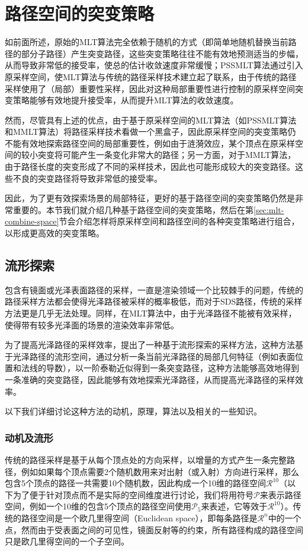 \section{路径空间的突变策略}\label{sec:pt-manifold}
如前面所述，原始的MLT算法完全依赖于随机的方式（即简单地随机替换当前路径的部分子路径）产生突变路径，这些突变策略往往不能有效地预测适当的步幅，从而导致非常低的接受率，使总的估计收敛速度非常缓慢；PSSMLT算法通过引入原采样空间，使MLT算法与传统的路径采样技术建立起了联系，由于传统的路径采样使用了（局部）重要性采样，因此对这种局部重要性进行控制的原采样空间突变策略能够有效地提升接受率，从而提升MLT算法的收敛速度。

然而，尽管具有上述的优点，由于基于原采样空间的MLT算法（如PSSMLT算法和MMLT算法）将路径采样技术看做一个黑盒子，因此原采样空间的突变策略仍不能有效地探索路径空间的局部重要性，例如由于涟漪效应，某个顶点在原采样空间的较小突变将可能产生一条变化非常大的路径；另一方面，对于MMLT算法，由于路径长度的突变形成了不同的采样技术，因此也可能形成较大的突变路径。这些不良的突变路径将导致非常低的接受率。

因此，为了更有效探索场景的局部特征，更好的基于路径空间的突变策略仍然是非常重要的。本节我们就介绍几种基于路径空间的突变策略，然后在第\ref{sec:mlt-combine-space}节会介绍怎样将原采样空间和路径空间的各种突变策略进行组合，以形成更高效的突变策略。




\subsection{流形探索}\label{sec:mlt-me}
包含有镜面或光泽表面路径的采样，一直是渲染领域一个比较棘手的问题，传统的路径采样方法都会使得光泽路径被采样的概率极低，而对于SDS路径，传统的采样方法更是几乎无法处理。同样，在MLT算法中，由于光泽路径不能被有效采样，使得带有较多光泽面的场景的渲染效率非常低。

为了提高光泽路径的采样效率，\cite{a:ManifoldExplorationAMarkovChainMonteCarloTechniqueforRenderingSceneswithDifficultSpecularTransport}提出了一种基于流形探索的采样方法，这种方法基于光泽路径的流形空间，通过分析一条当前光泽路径的局部几何特征（例如表面位置和法线的导数），以一阶泰勒近似得到一条突变路径，这种方法能够高效地得到一条准确的突变路径，因此能够有效地探索光泽路径，从而提高光泽路径的采样效率。

以下我们详细讨论这种方法的动机，原理，算法以及相关的一些知识。



\subsubsection{动机及流形}\label{sec:mlt-manifold}
传统的路径采样是基于从每个顶点处的方向采样，以增量的方式产生一条完整路径，例如如果每个顶点需要2个随机数用来对出射（或入射）方向进行采样，那么包含5个顶点的路径一共需要10个随机数，因此构成一个10维的路径空间$\mathcal{R}^{10}$（以下为了便于针对顶点而不是实际的空间维度进行讨论，我们将用符号$\mathcal{P}$来表示路径空间，例如一个10维的包含5个顶点的路径空间使用$\mathcal{P}_5$来表述，它等效于$\mathcal{R}^{10}$）。传统的路径空间是一个欧几里得空间（Euclidean space），即每条路径是$\mathcal{R}^{n}$中的一个点，然而由于受表面之间的可见性，镜面反射等的约束，所有路径构成的路径空间只是欧几里得空间的一个子空间。

